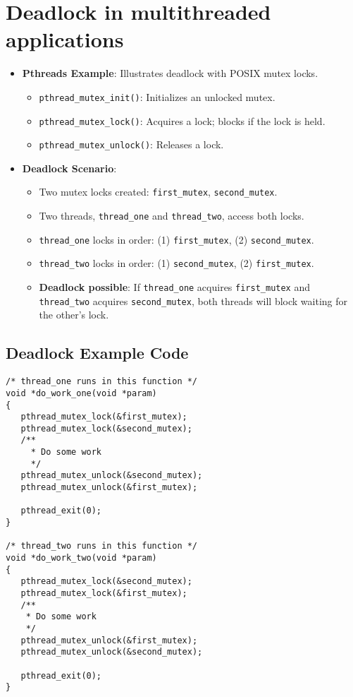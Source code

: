 \section{Deadlock in multithreaded applications}

\begin{itemize}
    \item \textbf{Pthreads Example}: Illustrates deadlock with POSIX mutex locks.
    \begin{itemize}
        \item \texttt{pthread\_mutex\_init()}: Initializes an unlocked mutex.
        \item \texttt{pthread\_mutex\_lock()}: Acquires a lock; blocks if the lock is held.
        \item \texttt{pthread\_mutex\_unlock()}: Releases a lock.
    \end{itemize}
    \item \textbf{Deadlock Scenario}:
    \begin{itemize}
        \item Two mutex locks created: \texttt{first\_mutex}, \texttt{second\_mutex}.
        \item Two threads, \texttt{thread\_one} and \texttt{thread\_two}, access both locks.
        \item \texttt{thread\_one} locks in order: (1) \texttt{first\_mutex}, (2) \texttt{second\_mutex}.
        \item \texttt{thread\_two} locks in order: (1) \texttt{second\_mutex}, (2) \texttt{first\_mutex}.
        \item \textbf{Deadlock possible}: If \texttt{thread\_one} acquires \texttt{first\_mutex} and \texttt{thread\_two} acquires \texttt{second\_mutex}, both threads will block waiting for the other's lock.
    \end{itemize}
\end{itemize}

\subsection{Deadlock Example Code}
\begin{verbatim}
/* thread_one runs in this function */
void *do_work_one(void *param)
{
   pthread_mutex_lock(&first_mutex);
   pthread_mutex_lock(&second_mutex);
   /**
     * Do some work
     */
   pthread_mutex_unlock(&second_mutex);
   pthread_mutex_unlock(&first_mutex);
 
   pthread_exit(0);
}
 
/* thread_two runs in this function */
void *do_work_two(void *param)
{
   pthread_mutex_lock(&second_mutex);
   pthread_mutex_lock(&first_mutex);
   /**
    * Do some work
    */
   pthread_mutex_unlock(&first_mutex);
   pthread_mutex_unlock(&second_mutex);
 
   pthread_exit(0);
}
\end{verbatim}

